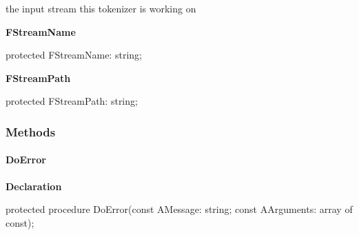 \documentclass{report}
\newif\ifpdf
\begin{document}
\begin{list}{}
\begin{flushleft}
\ifpdf
\end{flushleft}
\fi


\par the input stream this tokenizer is working on\label{PasDoc_Tokenizer.TTokenizer-FStreamName}
\item[\textbf{FStreamName}\hfill]
\ifpdf
\begin{flushleft}
\fi
\begin{ttfamily}
protected FStreamName: string;\end{ttfamily}

\ifpdf
\end{flushleft}
\fi


\par  \label{PasDoc_Tokenizer.TTokenizer-FStreamPath}
\item[\textbf{FStreamPath}\hfill]
\ifpdf
\begin{flushleft}
\fi
\begin{ttfamily}
protected FStreamPath: string;\end{ttfamily}

\ifpdf
\end{flushleft}
\fi


\par  \end{list}
\subsubsection*{\large{\textbf{Methods}}\normalsize\hspace{1ex}\hfill}
\paragraph*{DoError}\hspace*{\fill}

\label{PasDoc_Tokenizer.TTokenizer-DoError}
\begin{list}{}{
\setlength{\itemindent}{0cm}
\setlength{\listparindent}{0cm}
\setlength{\leftmargin}{\evensidemargin}
\addtolength{\leftmargin}{\tmplength}
\settowidth{\labelsep}{X}
\addtolength{\leftmargin}{\labelsep}
\setlength{\labelwidth}{\tmplength}
}
\item[\textbf{Declaration}\hfill]
\ifpdf
\begin{flushleft}
\fi
\begin{ttfamily}
protected procedure DoError(const AMessage: string; const AArguments: array of const);\end{ttfamily}

\ifpdf
\end{flushleft}
\fi

\end{list}
\end{document}

